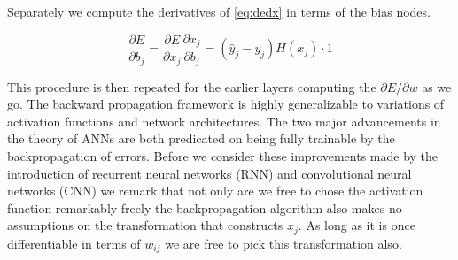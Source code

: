\noindent Separately we compute the derivatives of \ref{eq:dedx} in terms of the bias nodes.

\begin{equation}
\frac{\partial E}{\partial b_j} = \frac{\partial E}{\partial x_j} \frac{\partial x_j}{\partial b_j} =   (\hat{y}_{j} - y_{j}) H(x_j) \cdot 1
\end{equation}

\noindent This procedure is then repeated for the earlier layers computing the $
\partial E / \partial w $ as we go. The backward propagation framework is highly generalizable to variations of activation functions and network architectures. The two major advancements in the theory of ANNs are both predicated on being fully trainable by the backpropagation of errors. Before we consider these improvements made by the introduction of recurrent neural networks (RNN) and convolutional neural networks (CNN) we remark that not only are we free to chose the activation function remarkably freely the backpropagation algorithm also makes no assumptions on the transformation that constructs $x_j$. As long as it is once differentiable in terms of $w_{ij}$ we are free to pick this transformation also. 